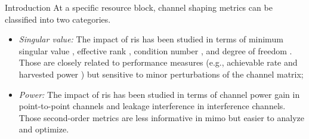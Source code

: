 \documentclass[journal]{IEEEtran}
\begin{document}
\begin{section}{Introduction}
		At a specific resource block, channel shaping metrics can be classified into two categories.
		\begin{itemize}
			\item \emph{Singular value:} The impact of \gls{ris} has been studied in terms of minimum singular value \cite{ElMossallamy2021}, effective rank \cite{ElMossallamy2021,Meng2023}, condition number \cite{Zheng2022,Huang2023}, and degree of freedom \cite{Bafghi2022,Zheng2023,Chae2023}. Those are closely related to performance measures (e.g., achievable rate and harvested power \cite{Shen2021}) but sensitive to minor perturbations of the channel matrix;
			\item \emph{Power:} The impact of \gls{ris} has been studied in terms of channel power gain \cite{Wu2019,Shen2020a,Nerini2023,Nerini2024,Santamaria2023} in point-to-point channels and leakage interference \cite{Santamaria2023a} in interference channels. Those second-order metrics are less informative in \gls{mimo} but easier to analyze and optimize.
		\end{itemize}


\end{section}
\end{document}
